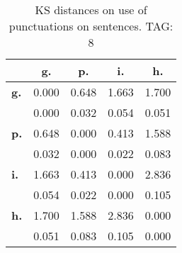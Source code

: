 \begin{table}[h!]
\begin{center}
\begin{tabular}{| l || c | c | c | c |}\hline
 & {\bf g.} & {\bf p.} & {\bf i.} & {\bf h.} \\\hline\hline
{\bf g.} & 0.000 & 0.648 & 1.663 & 1.700 \\
{\bf } & 0.000 & 0.032 & 0.054 & 0.051 \\\hline
{\bf p.} & 0.648 & 0.000 & 0.413 & 1.588 \\
{\bf } & 0.032 & 0.000 & 0.022 & 0.083 \\\hline
{\bf i.} & 1.663 & 0.413 & 0.000 & 2.836 \\
{\bf } & 0.054 & 0.022 & 0.000 & 0.105 \\\hline
{\bf h.} & 1.700 & 1.588 & 2.836 & 0.000 \\
{\bf } & 0.051 & 0.083 & 0.105 & 0.000 \\\hline
\end{tabular}
\caption{KS distances on use of punctuations on sentences. TAG: 8}
\end{center}
\end{table}